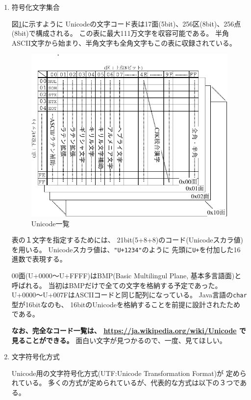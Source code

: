 \documentclass[a4j,dvipdfmx]{jarticle}
\begin{document}
\begin{enumerate}
\begin{enumerate}
\item 符号化文字集合

図\ref{fig6}に示すように
Unicodeの文字コード表は17面(5bit)、256区(8bit)、256点(8bit)で構成される。
この表に最大111万文字を収容可能である。
半角ASCII文字から始まり、半角文字も全角文字もこの表に収録されている。

\begin{figure}[hbtp]
\begin{center}
\includegraphics[scale=0.9]{unicode.pdf}
\caption{Unicode一覧}
\label{fig6}
\end{center}
\end{figure}

表の１文字を指定するためには、
21bit(5+8+8)のコード(Unicodeスカラ値)を用いる。
Unicodeスカラ値は、\verb/"U+1234"/のように
先頭に\verb/U+/を付加した16進数で表現する。

00面(U+0000〜U+FFFF)はBMP(Basic Multilingul Plane, 基本多言語面)と呼ばれる。
当初はBMPだけで全ての文字を格納する予定であった。
U+0000〜U+007FはASCIIコードと同じ配列になっている。
Java言語の\verb/char/型が16bitなのも、
16bitのUnicodeを格納することを前提に設計されたためである。

{\bf なお、完全なコード一覧は、
\url{https://ja.wikipedia.org/wiki/Unicode}
で見ることができる。}
面白い文字が見つかるので、一度、見てほしい。

\item 文字符号化方式

Unicode用の文字符号化方式(UTF:Unicode Transformation Format)が
定められている。
多くの方式が定められているが、代表的な方式は以下の３つである。


\end{enumerate}
\end{enumerate}
\end{document}

